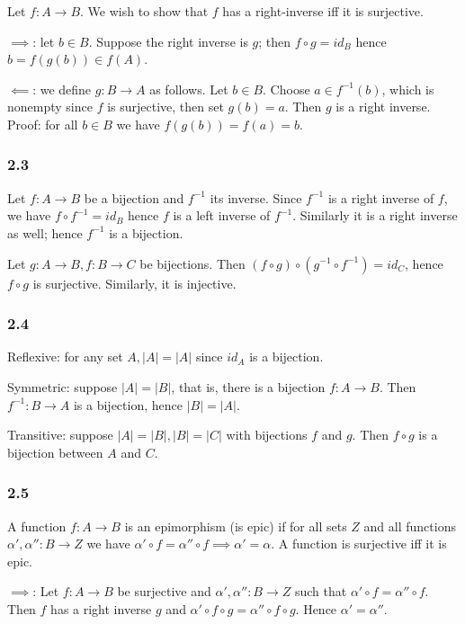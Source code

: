 \documentclass{article}
\begin{document}
Let $f: A \to B$. We wish to show that $f$ has a right-inverse iff it is surjective.

$\implies$: let $b \in B$. Suppose the right inverse is $g$; then $f \circ g = id_B$ hence $b = f(g(b)) \in f(A)$.

$\impliedby$: we define $g: B \to A$ as follows. Let $b \in B$. Choose $a \in f^{-1}(b)$, which is nonempty since $f$ is surjective, then set $g(b) = a$. Then $g$ is a right inverse. Proof: for all $b \in B$ we have $f(g(b)) = f(a) = b$.

\subsubsection*{2.3}

Let $f: A \to B$ be a bijection and $f^{-1}$ its inverse. Since $f^{-1}$ is a right inverse of $f$, we have $f \circ f^{-1} = id_B$ hence $f$ is a left inverse of $f^{-1}$. Similarly it is a right inverse as well; hence $f^{-1}$ is a bijection.

Let $g: A \to B, f: B \to C$ be bijections. Then $(f \circ g) \circ (g^{-1} \circ f^{-1}) = id_C$, hence $f \circ g$ is surjective. Similarly, it is injective.

\subsubsection*{2.4}

Reflexive: for any set $A, |A| = |A|$ since $id_A$ is a bijection.

Symmetric: suppose $|A| = |B|$, that is, there is a bijection $f: A \to B$. Then $f^{-1}: B \to A$ is a bijection, hence $|B| = |A|$.

Transitive: suppose $|A| = |B|, |B| = |C|$ with bijections $f$ and $g$. Then $f \circ g$ is a bijection between $A$ and $C$.

\subsubsection*{2.5}

A function $f: A \to B$ is an epimorphism (is epic) if for all sets $Z$ and all functions $\alpha', \alpha'': B \to Z$ we have $\alpha' \circ f = \alpha'' \circ f \implies \alpha' = \alpha$. A function is surjective iff it is epic.

$\implies$: Let $f: A \to B$ be surjective and $\alpha', \alpha'': B \to Z$ such that $\alpha' \circ f = \alpha'' \circ f$. Then $f$ has a right inverse $g$ and $\alpha' \circ f \circ g = \alpha'' \circ f \circ g$. Hence $\alpha' = \alpha''$.
\end{document}
